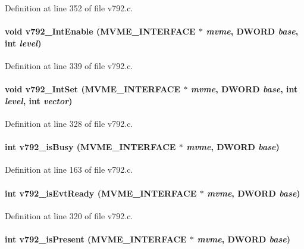 Definition at line 352 of file v792.c.
\paragraph[{v792\_\-IntEnable}]{\setlength{\rightskip}{0pt plus 5cm}void v792\_\-IntEnable ({\bf MVME\_\-INTERFACE} $\ast$ {\em mvme}, \/  {\bf DWORD} {\em base}, \/  int {\em level})}\hfill\label{v792_8c_adae02a9413e4b151f9ef8cc527e9d692}


Definition at line 339 of file v792.c.
\paragraph[{v792\_\-IntSet}]{\setlength{\rightskip}{0pt plus 5cm}void v792\_\-IntSet ({\bf MVME\_\-INTERFACE} $\ast$ {\em mvme}, \/  {\bf DWORD} {\em base}, \/  int {\em level}, \/  int {\em vector})}\hfill\label{v792_8c_ae704f9e359d9504f3623e75f836163b6}


Definition at line 328 of file v792.c.
\paragraph[{v792\_\-isBusy}]{\setlength{\rightskip}{0pt plus 5cm}int v792\_\-isBusy ({\bf MVME\_\-INTERFACE} $\ast$ {\em mvme}, \/  {\bf DWORD} {\em base})}\hfill\label{v792_8c_aca20abd4c5a3fbab6799d93f6effd5a0}


Definition at line 163 of file v792.c.
\paragraph[{v792\_\-isEvtReady}]{\setlength{\rightskip}{0pt plus 5cm}int v792\_\-isEvtReady ({\bf MVME\_\-INTERFACE} $\ast$ {\em mvme}, \/  {\bf DWORD} {\em base})}\hfill\label{v792_8c_a9cf758eade2bf73135ddb04beaebe579}


Definition at line 320 of file v792.c.
\paragraph[{v792\_\-isPresent}]{\setlength{\rightskip}{0pt plus 5cm}int v792\_\-isPresent ({\bf MVME\_\-INTERFACE} $\ast$ {\em mvme}, \/  {\bf DWORD} {\em base})}\hfill\label{v792_8c_aa0adfeaa5eca01071ebb851f38cc335c}



